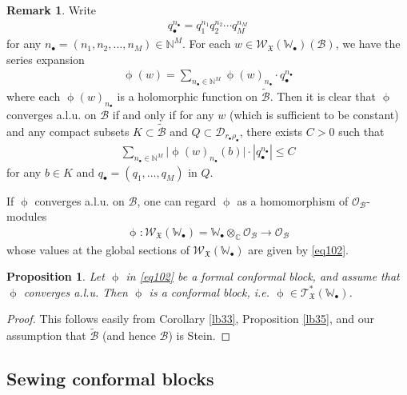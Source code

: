 \documentclass[12pt,a4paper,notitlepage]{report}
\theoremstyle{definition}
\newtheorem{rem}[df]{Remark}
\theoremstyle{plain}
\newtheorem{pp}[df]{Proposition}
\newcommand{\fk}{\mathfrak}
\newcommand{\mc}{\mathcal}
\newcommand{\wtd}{\widetilde}
\newcommand{\scr}{\mathscr}
\newcommand{\blt}{\bullet}
\newcommand{\Wbb}{\mathbb W}
\newcommand{\Cbb}{\mathbb C}
\newcommand{\Nbb}{\mathbb N}
\numberwithin{equation}{section}
\begin{document}
\begin{rem}\label{lb77}
Write
\begin{align*}
q_\blt^{n_\blt}=q_1^{n_1}q_2^{n_2}\cdots q_M^{n_M}
\end{align*}
for any $n_\blt=(n_1,n_2,\dots,n_M)\in\Nbb^M$. For each $w\in \scr W_{\fk X}(\Wbb_\blt)(\mc B)$, we have the series expansion
\begin{align*}
\upphi(w)=\sum_{n_\blt\in\Nbb^M}\upphi(w)_{n_\blt}\cdot q_\blt^{n_\blt}
\end{align*}
where each $\upphi(w)_{n_\blt}$ is a holomorphic function on $\wtd{\mc B}$. Then it is clear that  $\upphi$ converges a.l.u. on $\mc B$ if and only if for any $w$ (which is sufficient to be constant) and any  compact subsets $K\subset\wtd{\mc B}$ and $Q\subset\mc D_{r_\blt\rho_\blt}$,  there exists $C>0$ such that
\begin{align}
\sum_{n_\blt\in\Nbb^M}\big|\upphi(w)_{n_\blt}(b)\big|\cdot |q_\blt^{n_\blt}|\leq C
\end{align}
for any $b\in K$ and $q_\blt=(q_1,\dots,q_M)$ in $Q$. 
\end{rem}

If $\upphi$ converges a.l.u. on $\mc B$, one can regard $\upphi$ as a homomorphism of $\scr O_{\mc B}$-modules
\begin{align*}
\upphi:\scr W_{\fk X}(\Wbb_\blt)=\Wbb_\blt\otimes_\Cbb\scr O_{\mc B}\rightarrow\scr O_{\mc B}
\end{align*}
whose values at the global sections of $\scr W_{\fk X}(\Wbb_\blt)$  are given by \eqref{eq102}.

\begin{pp}\label{lb43}
Let $\upphi$ in \eqref{eq102} be a formal conformal block, and assume that $\upphi$ converges a.l.u. Then $\upphi$ is a conformal block, i.e. $\upphi\in\scr T_{\fk X}^*(\Wbb_\blt)$.
\end{pp}


\begin{proof}
This follows easily from Corollary \ref{lb33}, Proposition \ref{lb35}, and our assumption that $\wtd{\mc B}$ (and hence $\mc B$) is Stein.
\end{proof}







\subsection*{Sewing conformal blocks}
\end{document}
